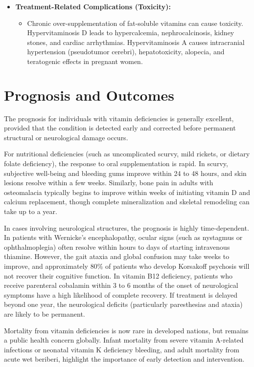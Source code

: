 \begin{itemize}
    \item \textbf{Treatment-Related Complications (Toxicity):}
    \begin{itemize}
        \item Chronic over-supplementation of fat-soluble vitamins can cause toxicity. Hypervitaminosis D leads to hypercalcemia, nephrocalcinosis, kidney stones, and cardiac arrhythmias. Hypervitaminosis A causes intracranial hypertension (pseudotumor cerebri), hepatotoxicity, alopecia, and teratogenic effects in pregnant women.
    \end{itemize}
\end{itemize}

\section*{Prognosis and Outcomes}
The prognosis for individuals with vitamin deficiencies is generally excellent, provided that the condition is detected early and corrected before permanent structural or neurological damage occurs.

For nutritional deficiencies (such as uncomplicated scurvy, mild rickets, or dietary folate deficiency), the response to oral supplementation is rapid. In scurvy, subjective well-being and bleeding gums improve within 24 to 48 hours, and skin lesions resolve within a few weeks. Similarly, bone pain in adults with osteomalacia typically begins to improve within weeks of initiating vitamin D and calcium replacement, though complete mineralization and skeletal remodeling can take up to a year.

In cases involving neurological structures, the prognosis is highly time-dependent. In patients with Wernicke's encephalopathy, ocular signs (such as nystagmus or ophthalmoplegia) often resolve within hours to days of starting intravenous thiamine. However, the gait ataxia and global confusion may take weeks to improve, and approximately 80\% of patients who develop Korsakoff psychosis will not recover their cognitive function. In vitamin B12 deficiency, patients who receive parenteral cobalamin within 3 to 6 months of the onset of neurological symptoms have a high likelihood of complete recovery. If treatment is delayed beyond one year, the neurological deficits (particularly paresthesias and ataxia) are likely to be permanent.

Mortality from vitamin deficiencies is now rare in developed nations, but remains a public health concern globally. Infant mortality from severe vitamin A-related infections or neonatal vitamin K deficiency bleeding, and adult mortality from acute wet beriberi, highlight the importance of early detection and intervention.

